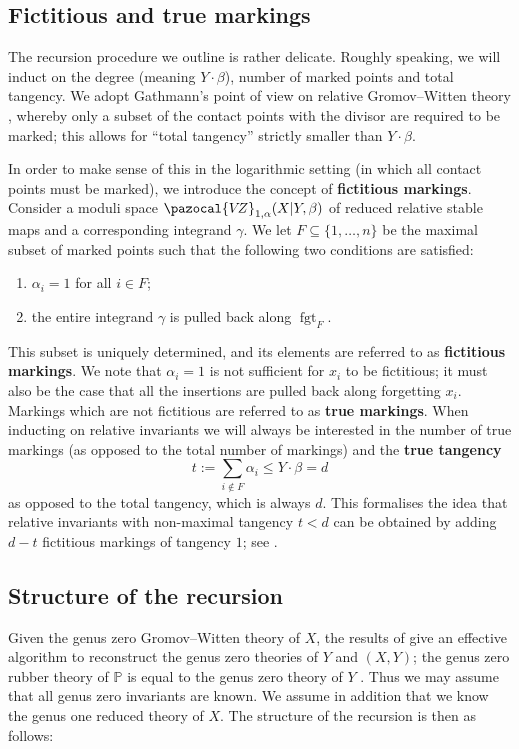 \documentclass[11pt]{amsart}
\newcommand{\VZ}{\pazocal{V\!Z}}
\newcommand{\fgt}{\operatorname{fgt}}
\theoremstyle{definition}
\theoremstyle{definition}
\begin{document}
\subsection{Fictitious and true markings} The recursion procedure we outline is rather delicate. Roughly speaking, we will induct on the degree (meaning $Y\cdot\beta$), number of marked points and total tangency. We adopt Gathmann's point of view on relative Gromov--Witten theory \cite{Ga}, whereby only a subset of the contact points with the divisor are required to be marked; this allows for ``total tangency'' strictly smaller than $Y\cdot\beta$.

In order to make sense of this in the logarithmic setting (in which all contact points must be marked), we introduce the concept of \textbf{fictitious markings}. Consider a moduli space $\VZ_{1,\alpha}(X|Y,\beta)$ of reduced relative stable maps and a corresponding integrand $\gamma$. We let $F \subseteq \{1,\ldots,n\}$ be the maximal subset of marked points such that the following two conditions are satisfied:
\begin{enumerate}
\item $\alpha_i = 1$ for all $i \in F$;
\item the entire integrand $\gamma$ is pulled back along $\fgt_F$.
\end{enumerate}
This subset is uniquely determined, and its elements are referred to as \textbf{fictitious markings}. We note that $\alpha_i=1$ is not sufficient for $x_i$ to be fictitious; it must also be the case that all the insertions are pulled back along forgetting $x_i$. Markings which are not fictitious are referred to as \textbf{true markings}. When inducting on relative invariants we will always be interested in the number of true markings (as opposed to the total number of markings) and the \textbf{true tangency}
\begin{equation*} t:= \sum_{i \not\in F} \alpha_i \leq Y\cdot \beta =d\end{equation*}
as opposed to the total tangency, which is always $d$. This formalises the idea that relative invariants with non-maximal tangency $t<d$ can be obtained by adding $d-t$ fictitious markings of tangency $1$; see \cite[Lemma 1.15(i)]{Ga}.

\subsection{Structure of the recursion} Given the genus zero Gromov--Witten theory of $X$, the results of \cite{Ga} give an effective algorithm to reconstruct the genus zero theories of $Y$ and $(X,Y)$; the genus zero rubber theory of $\mathbb{P}$ is equal to the genus zero theory of $Y$ \cite{GathmannThesis}. Thus we may assume that all genus zero invariants are known. We assume in addition that we know the genus one reduced theory of $X$. The structure of the recursion is then as follows:\bigskip
\end{document}
